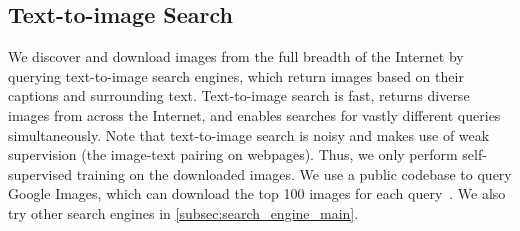 \subsection{Text-to-image Search}
\label{subsec:text_to_image_search}
We discover and download images from the full breadth of the Internet by querying text-to-image search engines, which return images based on their captions and surrounding text. Text-to-image search is fast, returns diverse images from across the Internet, and enables searches for vastly different queries simultaneously. Note that text-to-image search is noisy and makes use of weak supervision (the image-text pairing on webpages). Thus, we only perform self-supervised training on the downloaded images. We use a public codebase to query Google Images, which can download the top 100 images for each query~\cite{hardikvasa, Joeclinton1}. We also try other search engines in \cref{subsec:search_engine_main}.

